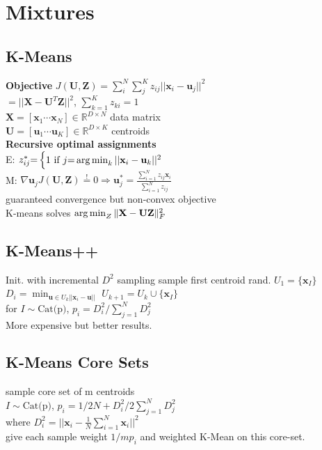 \section*{Mixtures}

\subsection*{K-Means}
\textbf{Objective} 
$J(\textbf{U},\textbf{Z}){=}\sum_{i}^N\sum_{j}^K z_{i j}||\textbf{x}_i{-}\textbf{u}_j||^2$\\
$=||\textbf{X}-\textbf{U}^T\textbf{Z}||^2$, $\sum_{k=1}^K z_{k i}=1$\\
$\textbf{X}=[\textbf{x}_1 \dotsi \textbf{x}_N]\in \mathbb{R}^{D \times N}$ data matrix\\
$ \textbf{U}=[\textbf{u}_1 \dotsi \textbf{u}_K]\in\mathbb{R}^{D\times K}$ centroids\\
\textbf{Recursive optimal assignments}
\\
E: $z_{i j}^*{=}\begin{cases}1\text{ if }j{=}\operatorname*{arg\,min}_k||\textbf{x}_i-\textbf{u}_k||^2\end{cases}$
\\
M: $\nabla\textbf{u}_j J(\textbf{U}, \textbf{Z})\stackrel{!}{=}0 \Rightarrow\textbf{u}_{j}^*=\frac{\sum_{i=1}^N z_{i j}\textbf{x}_i }{\sum_{i=1}^N z_{ij}}$\\
guaranteed convergence but non-convex objective\\
K-means solves $\operatorname*{arg\,min}_Z\|\mathbf{X}-\mathbf{UZ}\|_F^2$
\subsection*{K-Means++}
Init. with incremental $D^2$ sampling
sample first centroid rand. $U_1=\{\textbf{x}_I\}$
$D_i = \min_{\textbf{u}\in U_k||\textbf{x}_i- \textbf{u}||}$
$U_{k+1}=U_k\cup\{\textbf{x}_I\}$\\
for $I \sim \text{Cat(p)}$,  $p_i{=}{D_i^2}/{\sum_{j=1}^N}D_j^2$\\
More expensive but better results.

\subsection*{K-Means Core Sets}
sample core set of m centroids\\
$I{\sim}\text{Cat(p)}$, $p_i{=}{1}/{2 N}{+}{D_i^2}/{2 \sum_{j=1}^N D_j^2 }$\\
 where $D_i^2=||\textbf{x}_i-\frac{1}{N}\sum_{i=1}^N\textbf{x}_i||^2$\\
give each sample weight $1/mp_i$ and weighted K-Mean on this core-set.

